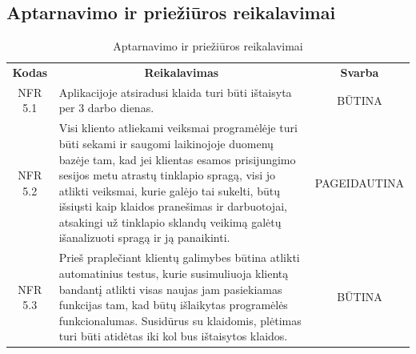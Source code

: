 \documentclass{VUMIFPSkursinis}
\begin{document}
\subsection{Aptarnavimo ir priežiūros reikalavimai}
\begin{center}
	\begin{table}[H]
	\caption{Aptarnavimo ir priežiūros reikalavimai}
	\begin{tabular}{|p{2cm}|p{}|p{}|}
	\hline
	    \rowcolor{lightgray}
		\multicolumn{3}{|c|}{Aptarnavimo ir priežiūros reikalavimai}\\
		
	\hline
		\multicolumn{1}{|c|}{{\bfseries Kodas}}&
		\multicolumn{1}{|c|}{{\bfseries Reikalavimas}}&
		\multicolumn{1}{|c|}{{\bfseries Svarba}}\\
	\hline 	
		\multicolumn{1}{|c|}{NFR 5.1}&
		{Aplikacijoje atsiradusi klaida turi būti ištaisyta per 3 darbo dienas.}&
		\multicolumn{1}{|c|}{BŪTINA}\\	
	
	\hline 	
		\multicolumn{1}{|c|}{NFR 5.2}&
		{Visi kliento atliekami veiksmai programėlėje turi būti sekami ir saugomi laikinojoje duomenų bazėje tam, kad jei klientas esamos prisijungimo sesijos metu atrastų tinklapio spragą, visi jo atlikti veiksmai, kurie galėjo tai sukelti, būtų išsiųsti kaip klaidos pranešimas ir darbuotojai, atsakingi už tinklapio sklandų veikimą galėtų išanalizuoti spragą ir ją panaikinti.}&
		\multicolumn{1}{|p{1.5cm}|}{PAGEIDAUTINA}\\
	
	\hline 	
		\multicolumn{1}{|c|}{NFR 5.3}&
		{Prieš praplečiant klientų galimybes būtina atlikti automatinius testus, kurie susimuliuoja klientą bandantį atlikti visas naujas jam pasiekiamas funkcijas tam, kad būtų išlaikytas programėlės funkcionalumas. Susidūrus su klaidomis, plėtimas turi būti atidėtas iki kol bus ištaisytos klaidos.}&
		\multicolumn{1}{|c|}{BŪTINA}\\	
		
	\hline 	
	
	\end{tabular}
	
	\label{table:Aptarnavimoirpriežiūrosreikalavimai}
	\end{table}

\end{center}
\end{document}
